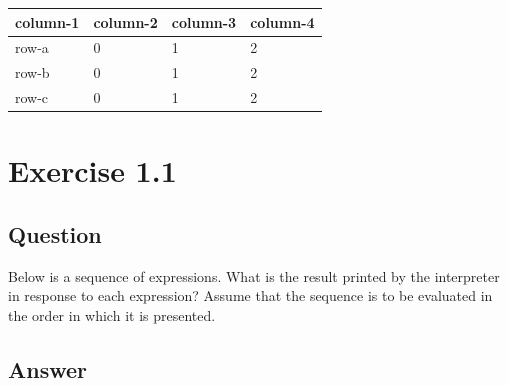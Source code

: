 \documentclass[
]{article}
\begin{document}
\begin{longtable}[]{@{}llll@{}}
\toprule
column-1 & column-2 & column-3 & column-4 \\
\midrule
\endhead
row-a & 0 & 1 & 2 \\
row-b & 0 & 1 & 2 \\
row-c & 0 & 1 & 2 \\
\bottomrule
\end{longtable}

\hypertarget{exercise-1.1}{%
\section{Exercise 1.1}\label{exercise-1.1}}

\hypertarget{question}{%
\subsection{Question}\label{question}}

Below is a sequence of expressions. What is the result printed by the
interpreter in response to each expression? Assume that the sequence is
to be evaluated in the order in which it is presented.

\hypertarget{answer}{%
\subsection{Answer}\label{answer}}
\end{document}

